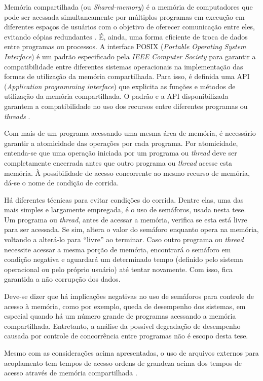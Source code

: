 Memória compartilhada (ou \textit{Shared-memory}) é a memória de computadores que pode ser
acessada simultaneamente por múltiplos programas em execução em diferentes
espaços de usuários com o objetivo de oferecer comunicação entre
eles, evitando cópias redundantes \cite{Robbins2003}. É, ainda, uma forma eficiente
de troca de dados entre programas ou processos. A interface POSIX
(\textit{Portable Operating System Interface}) \cite{Walli1995} é um
padrão especificado pela \textit{IEEE Computer Society} para garantir
a compatibilidade entre diferentes sistemas operacionais na implementação
das formas de utilização da memória compartilhada. Para isso, é definida
uma API (\textit{Application programming interface}) que explicita as funções
e métodos de utilização da memória compartilhada. O padrão e a API disponibilizada
garantem a compatibilidade no uso dos recursos entre diferentes programas ou \textit{threads}
\cite{Atlidakis2016}.

Com mais de um programa acessando uma mesma área de memória, é necessário garantir a atomicidade
das operações por cada programa. Por atomicidade, entenda-se que uma operação iniciada por um
programa ou \textit{thread} deve ser completamente encerrada antes que outro programa ou
\textit{thread} acesse esta memória. À possibilidade de acesso concorrente ao mesmo recurso
de memória, dá-se o nome de condição de corrida.

Há diferentes técnicas para evitar condições do corrida. Dentre elas, uma das mais simples e
largamente empregada, é o uso de semáforos, usada nesta tese.
Um programa ou \textit{thread}, antes de acessar a memória,
verifica se esta está livre para ser acessada. Se sim, altera o valor do semáforo enquanto opera na
memória, voltando a alterá-lo para ``livre'' ao terminar. Caso outro programa ou \textit{thread}
necessite acessar a mesma porção de memória, encontrará o semáforo em condição negativa e aguardará
um determinado tempo (definido pelo sistema operacional ou pelo próprio usuário) até tentar novamente.
Com isso, fica garantida a não corrupção dos dados.

Deve-se dizer que há implicações negativas no uso de semáforos para controle de acesso à memória,
como por exemplo, queda de desempenho dos sistemas, em especial quando há um número grande
de programas acessando a memória compartilhada. Entretanto, a análise da possível degradação
de desempenho causada por controle de concorrência entre programas não é escopo desta tese.

Mesmo com as considerações acima apresentadas, o uso de arquivos externos para acoplamento
\cite{Hummel2016} tem tempos de acesso ordens de grandeza acima dos tempos de acesso
através de memória compartilhada \cite{Theler2013}.

